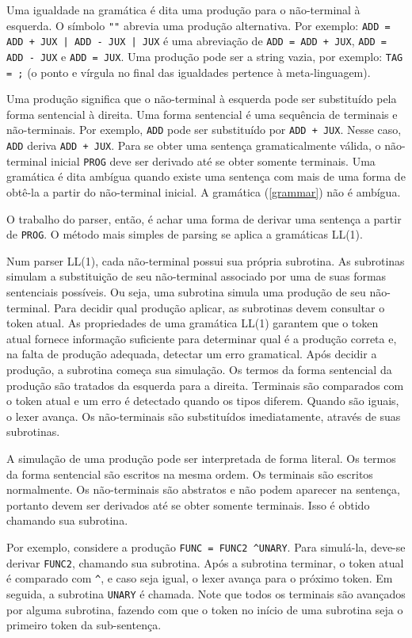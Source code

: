 \documentclass[10pt,a4paper]{article}
\begin{document}
Uma igualdade na gramática é dita uma produção para o não-terminal à esquerda.
O símbolo \texttt{"\textbar"}  abrevia uma produção alternativa. 
Por exemplo: \texttt{ADD = ADD + JUX | ADD - JUX | JUX}
é uma abreviação de \texttt{ADD = ADD + JUX}, \texttt{ADD = ADD - JUX} e \texttt{ADD = JUX}.
Uma produção pode ser a string vazia, por exemplo: \texttt{TAG = ;}
(o ponto e vírgula no final das igualdades pertence à meta-linguagem).

Uma produção significa que o não-terminal à esquerda pode ser substituído pela forma sentencial à direita.
Uma forma sentencial é uma sequência de terminais e não-terminais.
Por exemplo, \texttt{ADD} pode ser substituído por \texttt{ADD + JUX}.
Nesse caso, \texttt{ADD} deriva \texttt{ADD + JUX}.
Para se obter uma sentença gramaticalmente válida,
o não-terminal inicial \texttt{PROG} deve ser derivado até se obter somente terminais.
Uma gramática é dita ambígua quando existe uma sentença com mais de uma forma de
obtê-la a partir do não-terminal inicial. A gramática (\ref{grammar}) não é ambígua.

O trabalho do parser, então, é achar uma forma de derivar uma sentença a partir de \texttt{PROG}.
O método mais simples de parsing se aplica a gramáticas LL(1).

Num parser LL(1), cada não-terminal possui sua própria subrotina.
As subrotinas simulam a substituição de seu não-terminal associado por uma de suas formas sentenciais possíveis.
Ou seja, uma subrotina simula uma produção de seu não-terminal.
Para decidir qual produção aplicar, as subrotinas devem consultar o token atual.
As propriedades de uma gramática LL(1) garantem que o token atual fornece
informação suficiente para determinar qual é a produção correta e, na falta de produção adequada,
detectar um erro gramatical. Após decidir a produção, a subrotina começa sua simulação.
Os termos da forma sentencial da produção são tratados da esquerda para a direita.
Terminais são comparados com o token atual e um erro é detectado quando os tipos diferem.
Quando são iguais, o lexer avança. Os não-terminais são substituídos imediatamente, através de suas subrotinas.

A simulação de uma produção pode ser interpretada de forma literal.
Os termos da forma sentencial são escritos na mesma ordem.
Os terminais são escritos normalmente. Os não-terminais são abstratos e não podem aparecer na sentença,
portanto devem ser derivados até se obter somente terminais. Isso é obtido chamando sua subrotina.

Por exemplo, considere a produção \texttt{FUNC = FUNC2 \textasciicircum UNARY}.
Para simulá-la, deve-se derivar \texttt{FUNC2}, chamando sua subrotina.
Após a subrotina terminar, o token atual é comparado com \texttt{\textasciicircum},
e caso seja igual, o lexer avança para o próximo token. Em seguida, a subrotina \texttt{UNARY} é chamada.
Note que todos os terminais são avançados por alguma subrotina,
fazendo com que o token no início de uma subrotina seja o primeiro token da sub-sentença.
\end{document}
